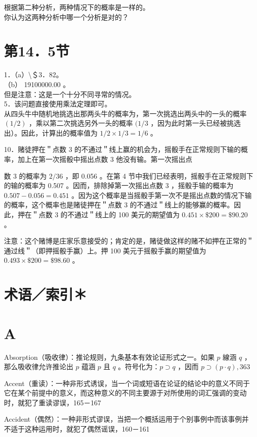 根据第二种分析，两种情况下的概率是一样的。\\
你认为这两种分析中哪一个分析是对的？

\section*{第14．5节}
1．（a）\textbackslash ＄3．82。\\
（b） 19100000.00 。\\
但是注意：这是一个十分不同寻常的情况。\\
5．该问题直接使用乘法定理即可。\\
从四头牛中随机地挑选出那两头牛的概率为，第一次挑选出两头中的一头的概率 $(1 / 2)$ ，乘以第二次挑选另外一头的概率 $(1 / 3$ ，因为此时第一头已经被挑选出）。因此，计算出的概率值为 $1 / 2 \times 1 / 3=1 / 6$ 。

10．赌徒押在＂点数 3 的不通过＂线上赢的机会为，摇骰手在正常规则下输的概率，加上在第一次摇骰中摇出点数 3 他没有输。第一次摇出点

数 3 的概率为 $2 / 36$ ，即 0.056 。在第 4 节中我们已经表明，摇骰手在正常规则下的输的概率为 0.507 。因而，排除掉第一次摇出点数 3 ，摇骰手输的概率为 $0.507-0.056=0.451$ 。因为这个概率是当摇骰手第一次不是摇出点数的情况下输的概率，这个概率也是赌徒押在＂点数 3 的不通过＂线上的能够赢的概率。因此，押在＂点数 3 的不通过＂线上的 100 美元的期望值为 $0.451 \times \$ 200=\$ 90.20$ 。

注意：这个赌博是庄家乐意接受的；肯定的是，赌徒做这样的赌不如押在正常的＂通过线＂（即押摇骰手赢）上。押 100 美元于摇骰手赢的期望值为 $0.493 \times \$ 200=\$ 98.60$ 。

\section*{术语／索引＊}
\section*{A}
Absorption（吸收律）：推论规则，九条基本有效论证形式之一。如果 $p$ 線涵 $q$ ，那么吸收律允许推论出 $p$ 蕴涵 $p$ 且 $q$ 。符号化为：$p \supset q$ ，因而 $p \supset(p \cdot q), 363$

Accent（重读）：一种非形式诱误，当一个词或短语在论证的结论中的意义不同于它在某个前提中的意义，而这种意义的不同主要源于对所使用的词汇强调的变动时，就犯了重读谬误，165－167

Accident（偶然）：一种非形式谬误，当把一个概括运用于个别事例中而该事例并不适于这种运用时，就犯了偶然谣误，160－161

